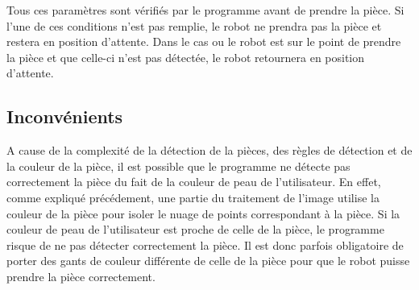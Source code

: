 Tous ces paramètres sont vérifiés par le programme avant de prendre la pièce. Si l'une de ces conditions n'est pas remplie, le robot ne prendra pas la pièce et restera en position d'attente. Dans le cas ou le robot est sur le point de prendre la pièce et que celle-ci n'est pas détectée, le robot retournera en position d'attente.

\subsection{Inconvénients}

A cause de la complexité de la détection de la pièces, des règles de détection et de la couleur de la pièce, il est possible que le programme ne détecte pas correctement la pièce du fait de la couleur de peau de l'utilisateur. En effet, comme expliqué précédement, une partie du traitement de l'image utilise la couleur de la pièce pour isoler le nuage de points correspondant à la pièce. Si la couleur de peau de l'utilisateur est proche de celle de la pièce, le programme risque de ne pas détecter correctement la pièce. Il est donc parfois obligatoire de porter des gants de couleur différente de celle de la pièce pour que le robot puisse prendre la pièce correctement.


